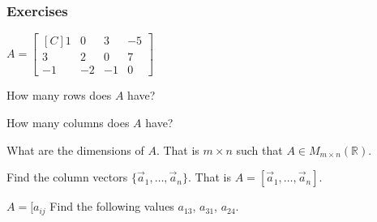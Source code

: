 \subsubsection{Exercises}
\begin{exercise}
$A=\begin{bmatrix*}[C]
1  & 0  & 3  & -5\\
3  & 2  & 0  & 7 \\
-1 & -2 & -1 & 0
\end{bmatrix*}$\\
\begin{inparaenum}[a.)]
\item How many rows does $A$ have?\\
\item How many columns does $A$ have?\\
\item What are the dimensions of $A$. That is $m \times n$ such that 
$A \in M_{m\times n}(\mathbb{R})$.\\
\item Find the column vectors $\{\vec{a}_1,\ldots,\vec{a}_n\}$. That is
$A=[\vec{a}_1,\ldots,\vec{a}_n]$.\\
\item $A=[a_{ij}$ Find the following values $a_{13}$, $a_{31}$, $a_{24}$. 
\end{inparaenum}
\end{exercise}
